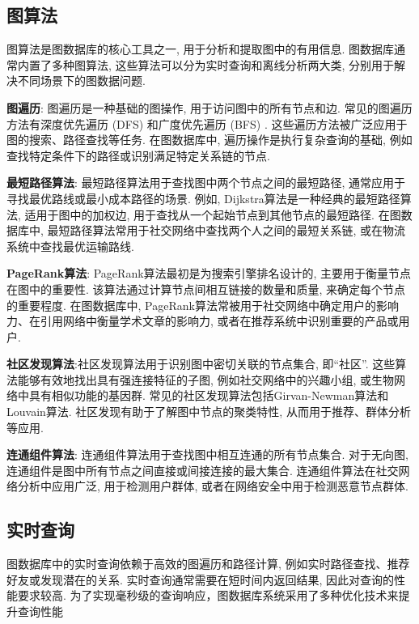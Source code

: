 \subsection{图算法}

图算法是图数据库的核心工具之一, 用于分析和提取图中的有用信息. 图数据库通常内置了多种图算法, 这些算法可以分为实时查询和离线分析两大类, 分别用于解决不同场景下的图数据问题.

\textbf{图遍历}: 图遍历是一种基础的图操作, 用于访问图中的所有节点和边. 常见的图遍历方法有深度优先遍历 (DFS) 和广度优先遍历 (BFS) . 这些遍历方法被广泛应用于图的搜索、路径查找等任务. 在图数据库中, 遍历操作是执行复杂查询的基础, 例如查找特定条件下的路径或识别满足特定关系链的节点.

\textbf{最短路径算法}: 最短路径算法用于查找图中两个节点之间的最短路径, 通常应用于寻找最优路线或最小成本路径的场景. 例如, Dijkstra算法是一种经典的最短路径算法, 适用于图中的加权边, 用于查找从一个起始节点到其他节点的最短路径. 在图数据库中, 最短路径算法常用于社交网络中查找两个人之间的最短关系链, 或在物流系统中查找最优运输路线.

\textbf{PageRank算法}: PageRank算法最初是为搜索引擎排名设计的, 主要用于衡量节点在图中的重要性. 该算法通过计算节点间相互链接的数量和质量, 来确定每个节点的重要程度. 在图数据库中, PageRank算法常被用于社交网络中确定用户的影响力、在引用网络中衡量学术文章的影响力, 或者在推荐系统中识别重要的产品或用户.

\textbf{社区发现算法}:社区发现算法用于识别图中密切关联的节点集合, 即“社区”. 这些算法能够有效地找出具有强连接特征的子图, 例如社交网络中的兴趣小组, 或生物网络中具有相似功能的基因群. 常见的社区发现算法包括Girvan-Newman算法和Louvain算法. 社区发现有助于了解图中节点的聚类特性, 从而用于推荐、群体分析等应用.

\textbf{连通组件算法}: 连通组件算法用于查找图中相互连通的所有节点集合. 对于无向图, 连通组件是图中所有节点之间直接或间接连接的最大集合. 连通组件算法在社交网络分析中应用广泛, 用于检测用户群体, 或者在网络安全中用于检测恶意节点群体.



\subsection{实时查询}

图数据库中的实时查询依赖于高效的图遍历和路径计算, 例如实时路径查找、推荐好友或发现潜在的关系. 实时查询通常需要在短时间内返回结果, 因此对查询的性能要求较高. 为了实现毫秒级的查询响应，图数据库系统采用了多种优化技术来提升查询性能

